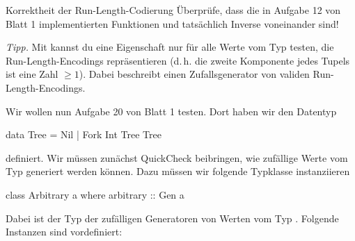 \documentclass{uebblatt}
\newcommand{\refaufgabe}[1]{#1} %
\begin{document}
\begin{aufgabe}{Korrektheit der Run-Length-Codierung}
  Überprüfe, dass die in Aufgabe \refaufgabe{12} von Blatt 1 implementierten
  Funktionen  und  tatsächlich
  Inverse voneinander sind!

  {\scriptsize \emph{Tipp.} Mit  kannst du eine Eigenschaft nur
  für alle Werte vom Typ 
  testen, die Run-Length-Encodings repräsentieren (d.\,h. die zweite Komponente
  jedes Tupels ist eine Zahl $\geq 1$). Dabei beschreibt
   einen Zufallsgenerator von validen
  Run-Length-Encodings.}
\end{aufgabe}

Wir wollen nun Aufgabe \refaufgabe{20} von Blatt 1 testen. Dort haben wir den
Datentyp

\begin{haskellcode}
data Tree = Nil | Fork Int Tree Tree
\end{haskellcode}

definiert. Wir müssen zunächst QuickCheck beibringen, wie zufällige Werte vom Typ  generiert werden können. Dazu müssen wir folgende Typklasse instanziieren

\begin{haskellcode}
class Arbitrary a where
  arbitrary :: Gen a
\end{haskellcode}

Dabei ist  der Typ der zufälligen Generatoren von Werten
vom Typ . Folgende Instanzen sind vordefiniert:

\end{document}
